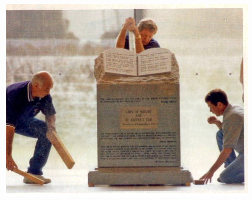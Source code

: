 \begin{frame}
    \centering
    \includegraphics[width=.9\textwidth]{img/10-commandments.jpg} \\
\end{frame}


